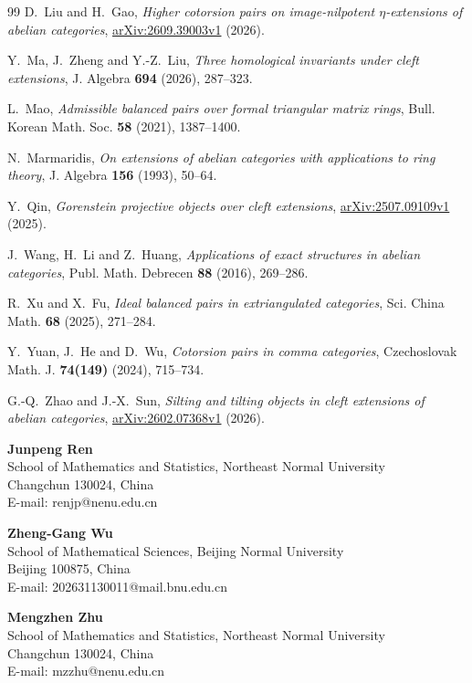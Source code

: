 \documentclass[11pt]{amsart}
\theoremstyle{definition}
\theoremstyle{remark}
\theoremstyle{plain}
\numberwithin{equation}{section}
\begin{document}
\begin{thebibliography}{99}
D.~Liu and H.~Gao,
\emph{Higher cotorsion pairs on image-nilpotent $\eta$-extensions of abelian categories},
\href{https://arxiv.org/abs/2609.39003v1}{arXiv:\allowbreak2609.39003v1} (2026).

Y.~Ma, J.~Zheng and Y.-Z.~Liu,
\emph{Three homological invariants under cleft extensions},
J. Algebra \textbf{694} (2026), 287--323.

L.~Mao,
\emph{Admissible balanced pairs over formal triangular matrix rings},
Bull. Korean Math. Soc. \textbf{58} (2021), 1387--1400.

N.~Marmaridis,
\emph{On extensions of abelian categories with applications to ring theory},
J. Algebra \textbf{156} (1993), 50--64.

Y.~Qin,
\emph{Gorenstein projective objects over cleft extensions},
\href{https://arxiv.org/abs/2507.09109v1}{arXiv:2507.09109v1} (2025).

J.~Wang, H.~Li and Z.~Huang,
\emph{Applications of exact structures in abelian categories},
Publ. Math. Debrecen \textbf{88} (2016), 269--286.

R.~Xu and X.~Fu,
\emph{Ideal balanced pairs in extriangulated categories},
Sci. China Math. \textbf{68} (2025), 271--284.

Y.~Yuan, J.~He and D.~Wu,
\emph{Cotorsion pairs in comma categories},
Czechoslovak Math. J. \textbf{74(149)} (2024), 715--734.

G.-Q.~Zhao and J.-X.~Sun,
\emph{Silting and tilting objects in cleft extensions of abelian categories},
\href{https://arxiv.org/abs/2602.07368v1}{arXiv:2602.07368v1} (2026).

\end{thebibliography}

\bigskip
{\small\raggedright
\noindent\textbf{Junpeng Ren}\\
School of Mathematics and Statistics, Northeast Normal University\\
Changchun 130024, China\\
E-mail: renjp@nenu.edu.cn

\medskip
\noindent\textbf{Zheng-Gang Wu}\\
School of Mathematical Sciences, Beijing Normal University\\
Beijing 100875, China\\
E-mail: 202631130011@mail.bnu.edu.cn

\medskip
\noindent\textbf{Mengzhen Zhu}\\
School of Mathematics and Statistics, Northeast Normal University\\
Changchun 130024, China\\
E-mail: mzzhu@nenu.edu.cn
\par}
\end{document}
